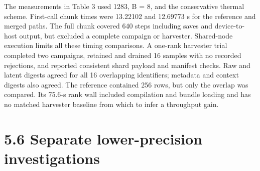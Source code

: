 \documentclass[11pt]{article}
\begin{document}
The measurements in Table 3 used 1283, B = 8, and the conservative thermal scheme. First-call
chunk times were 13.22102 and 12.69773 s for the reference and merged paths. The full chunk
covered 640 steps including saves and device-to-host output, but excluded a complete campaign or
harvester. Shared-node execution limits all these timing comparisons.
A one-rank harvester trial completed two campaigns, retained and drained 16 samples with no
recorded rejections, and reported consistent shard payload and manifest checks. Raw and latent
digests agreed for all 16 overlapping identifiers; metadata and context digests also agreed. The
reference contained 256 rows, but only the overlap was compared. Its 75.6-s rank wall included
compilation and bundle loading and has no matched harvester baseline from which to infer a
throughput gain.

\section*{5.6 Separate lower-precision investigations}
\end{document}
